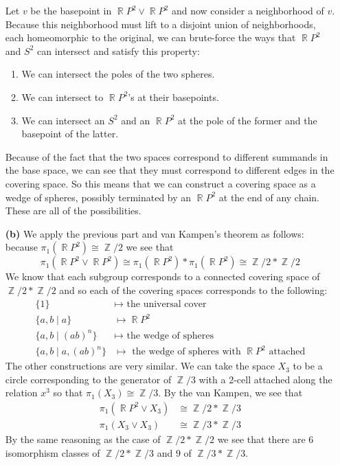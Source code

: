 \documentclass{article}
\DeclareMathOperator{\Z}{\mathbb{Z}}
\DeclareMathOperator{\R}{\mathbb{R}}
\begin{document}
\begin{enumerate}
  Let $v$ be the basepoint in $\R P^2 \vee \R P^2$ and now consider a
  neighborhood of $v$. Because this neighborhood must lift to a
  disjoint union of neighborhoods, each homeomorphic to the original,
  we can brute-force the ways that $\R P^2$ and $S^2$ can intersect
  and satisfy this property:
  \begin{enumerate}
  \item We can intersect the poles of the two spheres.
  \item We can intersect to $\R P^2$'s at their basepoints.
  \item We can intersect an $S^2$ and an $\R P^2$ at the pole of the
    former and the basepoint of the latter.
  \end{enumerate}
  Because of the fact that the two spaces correspond to different
  summands in the base space, we can see that they must correspond to
  different edges in the covering space. So this means that we can
  construct a covering space as a wedge of spheres, possibly
  terminated by an $\R P^2$ at the end of any chain. These are all of
  the possibilities.
\item[\textbf{(b)}] We apply the previous part and van Kampen's theorem
  as follows: because $\pi_1(\R P^2) \cong \Z/2$ we see that
  \[
  \pi_1(\R P^2 \vee \R P^2) \cong \pi_1(\R P^2) \ast \pi_1(\R P^2)
  \cong \Z/2 \ast \Z/2
  \]
  We know that each subgroup corresponds to a connected covering space
  of $\Z/2 \ast \Z/2$ and so each of the covering spaces corresponds
  to the following:
  \begin{align*}
  \{1\} &\mapsto \text{ the universal cover} \\
  \lbrace a,b \mid a\rbrace &\mapsto \R P^2 \\
  \lbrace a,b \mid (ab)^n\rbrace &\mapsto \text{ the wedge of spheres} \\
  \lbrace a,b \mid a,(ab)^n\rbrace &\mapsto \text{ the wedge of
    spheres with }\R P^2 \text{ attached}
  \end{align*}
  The other constructions are very similar. We can take the space
  $X_3$ to be a circle corresponding to the generator of $\Z/3$ with a
  2-cell attached along the relation $x^3$ so that $\pi_1(X_3) \cong
  \Z/3$. By the van Kampen, we see that
  \begin{align*}
    \pi_1(\R P^2 \vee X_3) &\cong \Z/2 \ast \Z/3 \\
    \pi_1(X_3 \vee X_3) &\cong \Z/3 \ast \Z/3
  \end{align*}
  By the same reasoning as the case of $\Z/2 \ast \Z/2$ we see that
  there are 6 isomorphism classes of $\Z/2 \ast \Z/3$ and 9 of $\Z/3
  \ast \Z/3$.
\end{enumerate}
\end{document}
